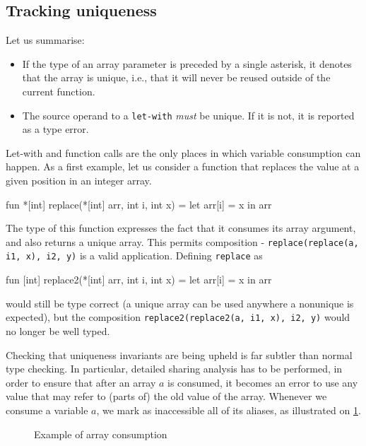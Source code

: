 \documentclass[oneside]{memoir}
\newcommand\aliases[1]{\textrm{aliases}(#1)}
\begin{document}
\subsection{Tracking uniqueness}
\label{sec:futhark-tracking-uniqueness}

Let us summarise:

\begin{itemize}
\item If the type of an array parameter is preceded by a single
  asterisk, it denotes that the array is unique, i.e., that it will
  never be reused outside of the current function.

\item The source operand to a \texttt{let-with} \textit{must} be
  unique.  If it is not, it is reported as a type error.
\end{itemize}

Let-with and function calls are the only places in which variable
consumption can happen.  As a first example, let us consider a
function that replaces the value at a given position in an integer
array.

\begin{colorcode}
  fun *[int] replace(*[int] arr, int i, int x) =
    let arr[i] = x in arr
\end{colorcode}

The type of this function expresses the fact that it consumes its
array argument, and also returns a unique array.  This permits
composition - \texttt{replace(replace(a, i1, x), i2, y)} is a valid
application.  Defining \texttt{replace} as
\begin{colorcode}
  fun [int] replace2(*[int] arr, int i, int x) =
    let arr[i] = x in arr
\end{colorcode}
would still be type correct (a unique array can be used anywhere a
nonunique is expected), but the composition
\texttt{replace2(replace2(a, i1, x), i2, y)} would no longer be well
typed.

Checking that uniqueness invariants are being upheld is far subtler
than normal type checking.  In particular, detailed sharing analysis
has to be performed, in order to ensure that after an array $a$ is
consumed, it becomes an error to use any value that may refer to
(parts of) the old value of the array.  Whenever we consume a variable
$a$, we mark as inaccessible all of its aliases, as illustrated on
\cref{fig:consumption}.

\begin{figure}
\begin{center}
\end{center}
\caption{Example of array consumption}
\label{fig:consumption}
\end{figure}
\end{document}
